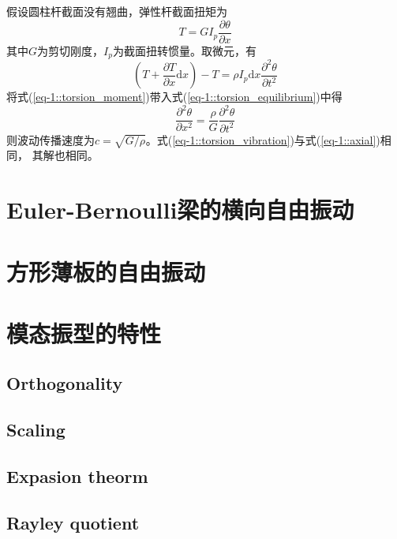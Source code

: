 假设圆柱杆截面没有翘曲，弹性杆截面扭矩为
\begin{equation}\label{eq-1::torsion_moment}
    T=GI_{p}\frac{\partial \theta}{\partial x}
\end{equation}
其中$G$为剪切刚度，$I_{p}$为截面扭转惯量。取微元，有
\begin{equation}\label{eq-1::torsion_equilibrium}
    \left(T+\frac{\partial T}{\partial x}\mathrm{d}x\right)-T=\rho I_{p}\mathrm{d}x\frac{\partial^{2}\theta}{\partial t^{2}}
\end{equation}
将式(\ref{eq-1::torsion_moment})带入式(\ref{eq-1::torsion_equilibrium})中得
\begin{equation}\label{eq-1::torsion_vibration}
    \frac{\partial^{2}\theta}{\partial x^{2}}=\frac{\rho}{G}\frac{\partial^{2}\theta}{\partial t^{2}}
\end{equation}
则波动传播速度为$c=\sqrt{G/\rho}$。式(\ref{eq-1::torsion_vibration})与式(\ref{eq-1::axial})相同，
其解也相同。

\section{Euler-Bernoulli梁的横向自由振动}

\section{方形薄板的自由振动}

\section{模态振型的特性}

\subsection{Orthogonality}
\subsection{Scaling}
\subsection{Expasion theorm}
\subsection{Rayley quotient}